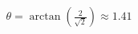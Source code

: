 \documentclass[preview]{standalone}
\begin{document}
\begin{align*}
\theta = \arctan\left(\frac{2}{\sqrt{2}}\right) \approx 1.41
\end{align*}
\end{document}

